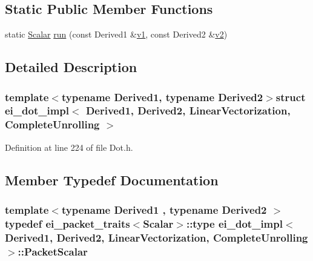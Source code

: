 \subsection*{Static Public Member Functions}
\begin{DoxyCompactItemize}
\item 
static \hyperlink{structei__dot__impl_3_01_derived1_00_01_derived2_00_01_linear_vectorization_00_01_complete_unrolling_01_4_a16334f659e0368c0d33734a5428e9712}{Scalar} \hyperlink{structei__dot__impl_3_01_derived1_00_01_derived2_00_01_linear_vectorization_00_01_complete_unrolling_01_4_a42d8cb3eab401feec2825076d121f8cc}{run} (const Derived1 \&\hyperlink{glext_8h_aabdd9aabede45fcf97cea04f88d2ad60}{v1}, const Derived2 \&\hyperlink{glext_8h_ae35401c8c2fcdcc48c20ba325ee473ea}{v2})
\end{DoxyCompactItemize}


\subsection{Detailed Description}
\subsubsection*{template$<$typename Derived1, typename Derived2$>$struct ei\-\_\-dot\-\_\-impl$<$ Derived1, Derived2, Linear\-Vectorization, Complete\-Unrolling $>$}



Definition at line 224 of file Dot.\-h.



\subsection{Member Typedef Documentation}
\hypertarget{structei__dot__impl_3_01_derived1_00_01_derived2_00_01_linear_vectorization_00_01_complete_unrolling_01_4_a796e5efff433441982f1b9604020d305}{
\subsubsection[{Packet\-Scalar}]{\setlength{\rightskip}{0pt plus 5cm}template$<$typename Derived1 , typename Derived2 $>$ typedef {\bf ei\-\_\-packet\-\_\-traits}$<${\bf Scalar}$>$\-::{\bf type} {\bf ei\-\_\-dot\-\_\-impl}$<$ Derived1, Derived2, {\bf Linear\-Vectorization}, {\bf Complete\-Unrolling} $>$\-::{\bf Packet\-Scalar}}}\label{structei__dot__impl_3_01_derived1_00_01_derived2_00_01_linear_vectorization_00_01_complete_unrolling_01_4_a796e5efff433441982f1b9604020d305}


